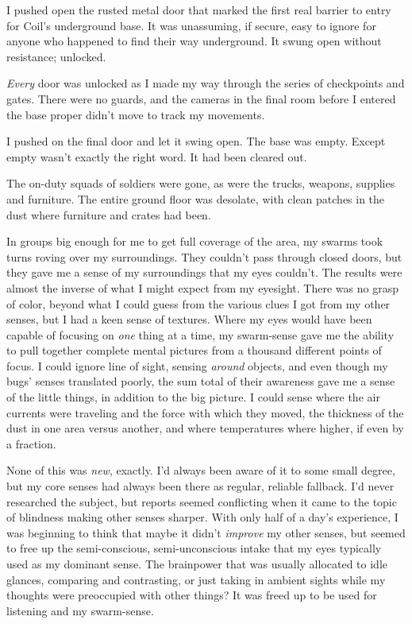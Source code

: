 





I pushed open the rusted metal door that marked the first real barrier to entry for Coil's underground base.  It was unassuming, if secure, easy to ignore for anyone who happened to find their way underground.  It swung open without resistance; unlocked.



\emph{Every} door was unlocked as I made my way through the series of checkpoints and gates.  There were no guards, and the cameras in the final room before I entered the base proper didn't move to track my movements.



I pushed on the final door and let it swing open.  The base was empty.  Except empty wasn't exactly the right word.  It had been cleared out.



The on-duty squads of soldiers were gone, as were the trucks, weapons, supplies and furniture.  The entire ground floor was desolate, with clean patches in the dust where furniture and crates had been.



In groups big enough for me to get full coverage of the area, my swarms took turns roving over my surroundings.  They couldn't pass through closed doors, but they gave me a sense of my surroundings that my eyes couldn't.  The results were almost the inverse of what I might expect from my eyesight.  There was no grasp of color, beyond what I could guess from the various clues I got from my other senses, but I had a keen sense of textures.  Where my eyes would have been capable of focusing on \emph{one} thing at a time, my swarm-sense gave me the ability to pull together complete mental pictures from a thousand different points of focus.  I could ignore line of sight, sensing \emph{around} objects, and even though my bugs' senses translated poorly, the sum total of their awareness gave me a sense of the little things, in addition to the big picture.  I could sense where the air currents were traveling and the force with which they moved, the thickness of the dust in one area versus another, and where temperatures where higher, if even by a fraction.



None of this was \emph{new}, exactly.  I'd always been aware of it to some small degree, but my core senses had always been there as regular, reliable fallback.  I'd never researched the subject, but reports seemed conflicting when it came to the topic of blindness making other senses sharper.  With only half of a day's experience, I was beginning to think that maybe it didn't \emph{improve} my other senses, but seemed to free up the semi-conscious, semi-unconscious intake that my eyes typically used as my dominant sense.  The brainpower that was usually allocated to idle glances, comparing and contrasting, or just taking in ambient sights while my thoughts were preoccupied with other things?  It was freed up to be used for listening and my swarm-sense.



